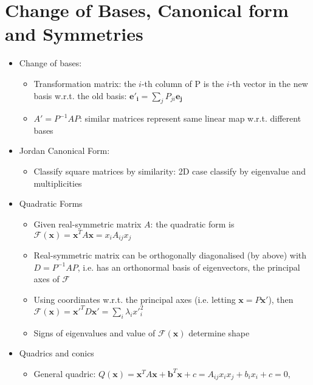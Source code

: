 \section{Change of Bases, Canonical form and Symmetries}
\begin{itemize}
      \item Change of bases:
            \begin{itemize}
                  \item Transformation matrix: the $i$-th column of P is the $i$-th vector
                        in the new basis w.r.t. the old basis: $\mathbf{e'_{i}}=\sum_{j}P_{ji}\mathbf{e_{j}}$
                  \item $A'=P^{-1}AP$: similar matrices represent same linear map w.r.t.
                        different bases
            \end{itemize}
      \item Jordan Canonical Form:
            \begin{itemize}
                  \item Classify square matrices by similarity: 2D case classify by eigenvalue
                        and multiplicities
            \end{itemize}
      \item Quadratic Forms
            \begin{itemize}
                  \item Given real-symmetric matrix $A$: the quadratic form is $\mathcal{F}(\mathbf{x})=\mathbf{x}^{T}A\mathbf{x}=x_{i}A_{ij}x_{j}$
                  \item Real-symmetric matrix can be orthogonally diagonalised (by above)
                        with $D=P^{-1}AP$, i.e. has an orthonormal basis of eigenvectors,
                        the principal axes of $\mathcal{F}$
                  \item Using coordinates w.r.t. the principal axes (i.e. letting $\mathbf{x}=P\mathbf{x'}$),
                        then $\mathcal{F}(\mathbf{x})=\mathbf{x'}^{T}D\mathbf{x'}=\sum_{i}\lambda_{i}x'^{2}_{i}$
                  \item Signs of eigenvalues and value of $\mathcal{F}(\mathbf{x})$ determine
                        shape
            \end{itemize}
      \item Quadrics and conics
            \begin{itemize}
                  \item General quadric: $Q(\mathbf{x})=\mathbf{x}^{T}A\mathbf{x}+\mathbf{b}^{T}\mathbf{x}+c=A_{ij}x_{i}x_{j}+b_{i}x_{i}+c=0$,

\end{itemize}
\end{itemize}
